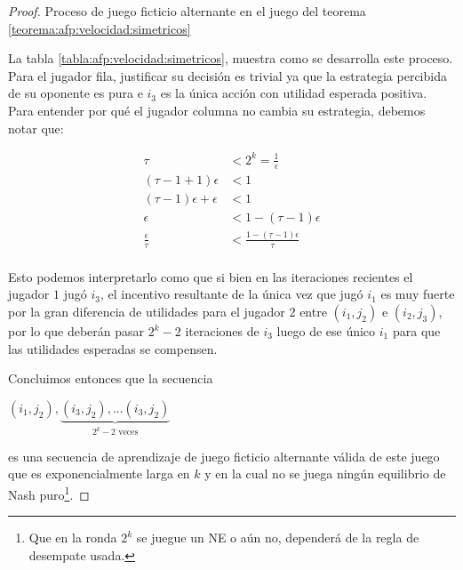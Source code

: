 \begin{proof}
    \begin{table}
        
        \caption{Proceso de juego ficticio alternante en el juego del teorema \ref{teorema:afp:velocidad:simetricos}}
        \label{tabla:afp:velocidad:simetricos}
    \end{table}

    La tabla \ref{tabla:afp:velocidad:simetricos}, muestra como se desarrolla este proceso. Para el jugador fila, justificar su decisión es trivial ya que la estrategia percibida de su oponente es pura e $i_3$ es la única acción con utilidad esperada positiva. Para entender por qué el jugador columna no cambia su estrategia, debemos notar que:

    \begin{align*}
        \tau &< 2^k = \frac{1}{\epsilon} \\
        (\tau - 1 + 1) \epsilon &< 1\\
        (\tau - 1) \epsilon + \epsilon &< 1\\
        \epsilon &< 1-(\tau-1)\epsilon\\
        \frac{\epsilon}{\tau} &< \frac{1-(\tau-1)\epsilon}{\tau}\\
    \end{align*}

    Esto podemos interpretarlo como que si bien en las iteraciones recientes el jugador $1$ jugó $i_3$, el incentivo resultante de la única vez que jugó $i_1$ es muy fuerte por la gran diferencia de utilidades para el jugador $2$ entre $(i_1, j_2)$ e $(i_2, j_3)$, por lo que deberán pasar $2^{k}-2$ iteraciones de $i_3$ luego de ese único $i_1$ para que las utilidades esperadas se compensen.

    Concluimos entonces que la secuencia

    \begin{center}
    \begin{math}
        (i_1, j_2), \underbrace{(i_3, j_2), ... (i_3, j_2)}_{\text{$2^k - 2$ veces}}
    \end{math}
    \end{center}

    es una secuencia de aprendizaje de juego ficticio alternante válida de este juego que es exponencialmente larga en $k$ y en la cual no se juega ningún equilibrio de Nash puro\footnote{Que en la ronda $2^k$ se juegue un NE o aún no, dependerá de la regla de desempate usada.}.

\end{proof}

